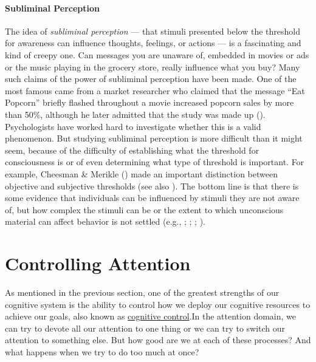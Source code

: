 \documentclass[
]{krantz}
\begin{document}
\paragraph*{Subliminal Perception}\label{subliminal-perception}

The idea of \emph{subliminal perception} --- that stimuli presented below the threshold for awareness can influence thoughts, feelings, or actions --- is a fascinating and kind of creepy one. Can messages you are unaware of, embedded in movies or ads or the music playing in the grocery store, really influence what you buy? Many such claims of the power of subliminal perception have been made. One of the most famous came from a market researcher who claimed that the message ``Eat Popcorn'' briefly flashed throughout a movie increased popcorn sales by more than 50\%, although he later admitted that the study was made up (). Psychologists have worked hard to investigate whether this is a valid phenomenon. But studying subliminal perception is more difficult than it might seem, because of the difficulty of establishing what the threshold for consciousness is or of even determining what type of threshold is important. For example, Cheesman \& Merikle () made an important distinction between objective and subjective thresholds (see also ). The bottom line is that there is some evidence that individuals can be influenced by stimuli they are not aware of, but how complex the stimuli can be or the extent to which unconscious material can affect behavior is not settled (e.g., ; ; ; ).

\section{Controlling Attention}\label{controlling-attention}

As mentioned in the previous section, one of the greatest strengths of our cognitive system is the ability to control how we deploy our cognitive resources to achieve our goals, also known as \hyperref[cognitive-control]{cognitive control}.In the attention domain, we can try to devote all our attention to one thing or we can try to switch our attention to something else. But how good are we at each of these processes? And what happens when we try to do too much at once?
\end{document}
